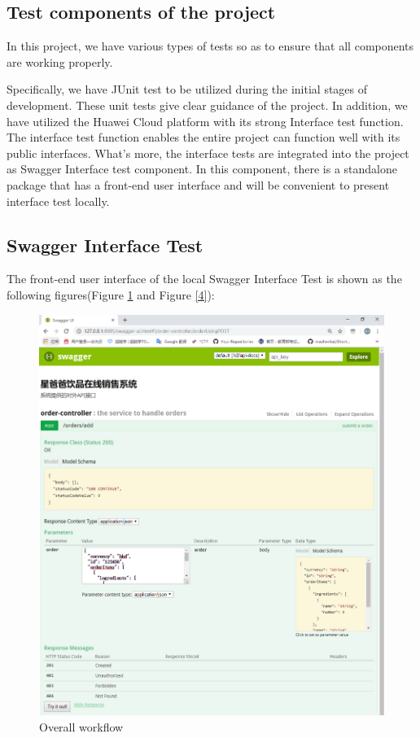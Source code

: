 \documentclass[a4paper]{report}
\begin{document}
\subsection{Test components of the project}
In this project, we have various types of tests so as to ensure that all components are working properly.
\par
Specifically, we have JUnit test to be utilized during the initial stages of development. These unit tests give clear guidance of the project.
In addition, we have utilized the Huawei Cloud platform with its strong Interface test function. The interface test function enables the entire project can function well with its public interfaces. What's more, the interface tests are integrated into the project as Swagger Interface test component. In this component, there is a standalone package that has a front-end user interface and will be convenient to present interface test locally.
\subsection{Swagger Interface Test}
The front-end user interface of the local Swagger Interface Test is shown as the following figures(Figure \ref{3} and Figure \ref{4}):

\begin{figure}
  \centering
  \includegraphics[scale=0.45]{swagger2.png}
  \caption{Overall workflow}\label{3}
\end{figure}
\end{document}
